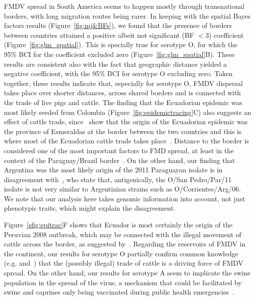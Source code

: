 \documentclass[10pt]{article}
\begin{document}
FMDV spread in South America seems to happen mostly through transnational borders, with long migration routes being rarer.
In keeping with the spatial Bayes factors results (Figure~\ref{fig:mj&BFs}), we found that the presence of borders between countries attained a positive albeit not significant (BF $<3$) coefficient (Figure~\ref{fig:glm_spatial}).
This is specially true for serotype O, for which the 95\% BCI for the coefficient excluded zero (Figure~\ref{fig:glm_spatial}B).
These results are consistent also with the fact that geographic distance yielded a negative coefficient, with the 95\% BCI for serotype O excluding zero.
Taken together, these results indicate that, especially for serotype O, FMDV dispersal takes place over shorter distances, across shared borders and is connected with the trade of live pigs and cattle.
The finding that the Ecuadorian epidemic was most likely seeded from Colombia (Figure~\ref{fig:epidemictracing}C) also suggests an effect of cattle trade, since~\citet{Carvalho2013} show that the origin of the Ecuadorian epidemic was the province of Esmeraldas at the border between the two countries and this is where most of the Ecuadorian cattle trade takes place~\citep{Maradei2011}. %
Distance to the border is considered one of the most important factors to FMD spread, at least in the context of the Paraguay/Brazil border~\citep{Amaral2016}.
On the other hand, our finding that Argentina was the most likely origin of the 2011 Paraguayan isolate is in disagreement with~\cite{Maradei2013}, who state that, antigenically, the O/San Pedro/Par/11 isolate is not very similar to Argentinian strains such as O/Corrientes/Arg/06.
We note that our analysis here takes genomic information into account, not just phenotypic traits, which might explain the disagreement.

Figure~\ref{sfig:epitrac}F shows that Ecuador is most certainly the origin of the Peruvian 2008 outbreak, which may be connected with the illegal movement of cattle across the border, as suggested by~\citet{Correa2002}.
Regarding the reservoirs of FMDV in the continent, our results for serotype O partially confirm common knowledge (e.g.\citep{Saraiva2003} and~\citep{Naranjo2013}) that the (possibly illegal) trade of cattle is a driving force of FMDV spread.
On the other hand, our results for serotype A seem to implicate the swine population in the spread of the virus, a mechanism that could be facilitated by swine and caprines only being vaccinated during public health emergencies~\citep{Saraiva2003}.
\end{document}
